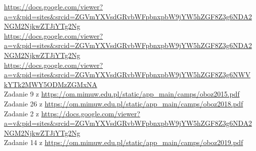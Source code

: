 
 \url{https://docs.google.com/viewer?a=v&pid=sites&srcid=ZGVmYXVsdGRvbWFpbnxpbW9jYW5hZGF8Z3g6NDA2NGM2NjkwZTJiYTg2Ng} \\
 \url{https://docs.google.com/viewer?a=v&pid=sites&srcid=ZGVmYXVsdGRvbWFpbnxpbW9jYW5hZGF8Z3g6NDA2NGM2NjkwZTJiYTg2Ng} \\
 \url{https://docs.google.com/viewer?a=v&pid=sites&srcid=ZGVmYXVsdGRvbWFpbnxpbW9jYW5hZGF8Z3g6NWVkYTk2MWY5ODMzZGMxNA} \\
 Zadanie 9 z \url{https://om.mimuw.edu.pl/static/app_main/camps/oboz2015.pdf} \\
 Zadanie 26 z \url{https://om.mimuw.edu.pl/static/app_main/camps/oboz2018.pdf} \\
 Zadanie 2 z \url{https://docs.google.com/viewer?a=v&pid=sites&srcid=ZGVmYXVsdGRvbWFpbnxpbW9jYW5hZGF8Z3g6NDA2NGM2NjkwZTJiYTg2Ng} \\
 Zadanie 14 z \url{https://om.mimuw.edu.pl/static/app_main/camps/oboz2019.pdf} \\